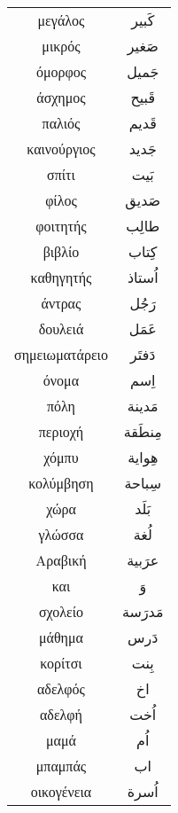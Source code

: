 \documentclass[twocolumn,a4paper]{article}
\newcommand{\ar}[1]{\textarabic{#1}}
\begin{document}
\renewcommand*{\arraystretch}{3}
\begin{supertabular}{ c c }

μεγάλος     & \ar{ كَبير } \\
μικρός      & \ar{ صَغير } \\
όμορφος     & \ar{ جَميل } \\
άσχημος     & \ar{ قَبيح } \\
παλιός      & \ar{ قَديم } \\
καινούργιος & \ar{ جَديد } \\
σπίτι       & \ar{ بَيت } \\
φίλος       & \ar{ صَديق } \\
φοιτητής    & \ar{ طالِب } \\
βιβλίο      & \ar{ كِتاب } \\
καθηγητής   & \ar{ اُستاذ} \\
άντρας      & \ar{ رَجُل } \\
δουλειά     & \ar{ عَمَل } \\
σημειωματάρειο & \ar{ دَفتَر } \\
όνομα       & \ar{اِسم } \\
πόλη        & \ar{ مَدينة } \\
περιοχή     & \ar{ مِنطَقة } \\
χόμπυ       & \ar{ هِواية } \\
κολύμβηση   & \ar{ سِباحة } \\
χώρα        & \ar{ بَلَد } \\
γλώσσα      & \ar{ لُغة } \\
Αραβική     & \ar{ عرَبية } \\
και         & \ar{ وَ } \\
σχολείο     & \ar{ مَدرَسة } \\
μάθημα      & \ar{ دَرس } \\
κορίτσι     & \ar{ بِنت } \\
αδελφός     & \ar{ اخ } \\
αδελφή      & \ar{ اُخت } \\
μαμά        & \ar{ اُم} \\
μπαμπάς     & \ar{ اب } \\
οικογένεια  & \ar{ اُسرة } \\


\end{supertabular}
\end{document}
